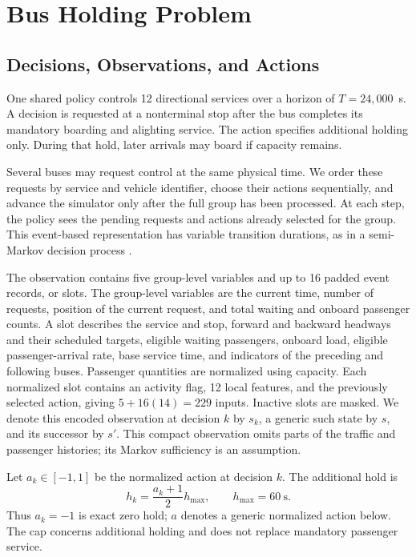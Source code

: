 \documentclass[letterpaper,journal]{IEEEtran}
\newcommand{\hmax}{h_{\max}}
\begin{document}
\section{Bus Holding Problem}
\label{sec:problem}
\subsection{Decisions, Observations, and Actions}
One shared policy controls 12 directional services over a horizon of \(T=24{,}000\)~s. A decision is requested at a nonterminal stop after the bus completes its mandatory boarding and alighting service. The action specifies additional holding only. During that hold, later arrivals may board if capacity remains.

Several buses may request control at the same physical time. We order these requests by service and vehicle identifier, choose their actions sequentially, and advance the simulator only after the full group has been processed. At each step, the policy sees the pending requests and actions already selected for the group. This event-based representation has variable transition durations, as in a semi-Markov decision process \cite{sutton1999between}.

The observation contains five group-level variables and up to 16 padded event records, or slots. The group-level variables are the current time, number of requests, position of the current request, and total waiting and onboard passenger counts. A slot describes the service and stop, forward and backward headways and their scheduled targets, eligible waiting passengers, onboard load, eligible passenger-arrival rate, base service time, and indicators of the preceding and following buses. Passenger quantities are normalized using capacity. Each normalized slot contains an activity flag, 12 local features, and the previously selected action, giving \(5+16(14)=229\) inputs. Inactive slots are masked. We denote this encoded observation at decision \(k\) by \(s_k\), a generic such state by \(s\), and its successor by \(s'\). This compact observation omits parts of the traffic and passenger histories; its Markov sufficiency is an assumption.

Let \(a_k\in[-1,1]\) be the normalized action at decision \(k\). The additional hold is
\begin{equation}
 h_k=\frac{a_k+1}{2}\hmax,\qquad \hmax=60~\mathrm{s}.
 \label{eq:action}
\end{equation}
Thus \(a_k=-1\) is exact zero hold; \(a\) denotes a generic normalized action below. The cap concerns additional holding and does not replace mandatory passenger service.
\end{document}
